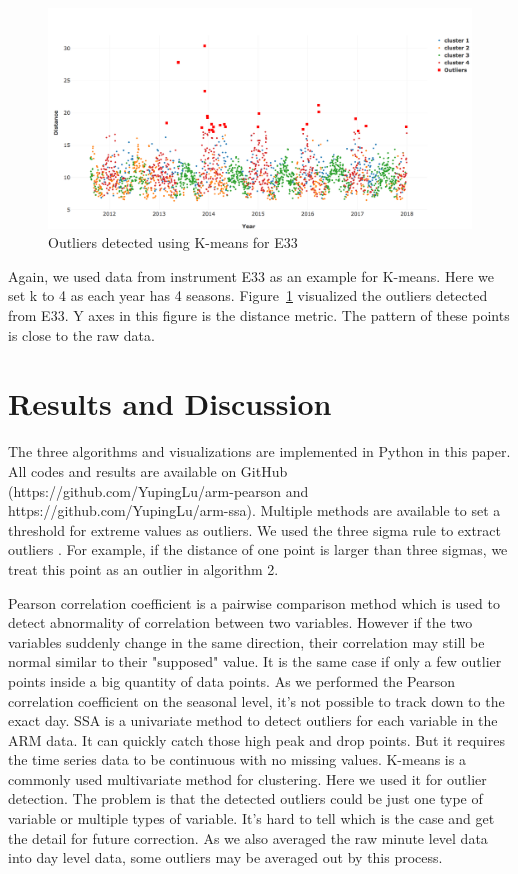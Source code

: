 \documentclass[letterpaper, 10 pt, conference]{ieeeconf}  %
\begin{document}
\begin{figure}[ht]
    \centering
    \includegraphics[width=\textwidth]{kmeans.png}
    \caption{Outliers detected using K-means for E33}
    \label{fig:kmeans}
\end{figure}

Again, we used data from instrument E33 as an example for K-means. Here we set k to 4 as each year has 4 seasons.  Figure~\ref{fig:kmeans} visualized the outliers detected from E33. Y axes in this figure is the distance metric. The pattern of these points is close to the raw data.

\section{Results and Discussion}
The three algorithms and visualizations are implemented in Python in this paper. All codes and results are available on GitHub (https://github.com/YupingLu/arm-pearson and https://github.com/YupingLu/arm-ssa). Multiple methods are available to set a threshold for extreme values as outliers. We used the three sigma rule to extract outliers \cite{pukelsheim1994three}. For example, if the distance of one point is larger than three sigmas, we treat this point as an outlier in algorithm 2.

Pearson correlation coefficient is a pairwise comparison method which is used to detect abnormality of correlation between two variables. However if the two variables suddenly change in the same direction, their correlation may still be normal similar to their "supposed" value. It is the same case if only a few outlier points inside a big quantity of data points. As we performed the Pearson correlation coefficient on the seasonal level, it's not possible to track down to the exact day. SSA is a univariate method to detect outliers for each variable in the ARM data. It can quickly catch those high peak and drop points. But it requires the time series data to be continuous with no missing values. K-means is a commonly used multivariate method for clustering. Here we used it for outlier detection. The problem is that the detected outliers could be just one type of variable or multiple types of variable. It's hard to tell which is the case and get the detail for future correction. As we also averaged the raw minute level data into day level data, some outliers may be averaged out by this process.
\end{document}
